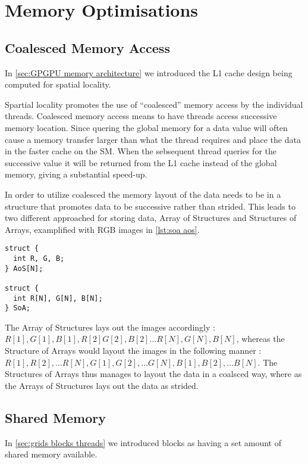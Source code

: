 \section{Memory Optimisations}
\label{sec:memory optimisations}
\subsection{Coalesced Memory Access}
\label{sec:coalesced}

In \cref{sec:GPGPU memory architecture} we introduced the L1 cache design being computed for spatial locality.

Spartial locality promotes the use of ``coalesced'' memory access by the individual threads.
Coalesced memory access means to have threads access successive memory location.
Since quering the global memory for a data value will often cause a memory transfer larger than what the thread requires and place the data in the faster cache on the SM.
When the sebsequent thread queries for the successive value it will be returned from the L1 cache instead of the global memory, giving a substantial speed-up.

In order to utilize coalesced the memory layout of the data needs to be in a structure that promotes data to be successive rather than strided.\cite{udacity}
This leads to two different approached for storing data, Array of Structures and Structures of Arrays, examplified with RGB images in \cref{lst:soa aos}.

\begin{lstlisting}[caption={Example of SoA and AoS with RGB images}, label={lst:soa aos}]
struct {
  int R, G, B;
} AoS[N];

struct {
  int R[N], G[N], B[N];
} SoA;
\end{lstlisting}

The Array of Structures lays out the images accordingly : $R[1], G[1], B[1], R[2] G[2], B[2] ... R[N], G[N], B[N]$, whereas the Structure of Arrays would layout the images in the following manner : $R[1], R[2], ... R[N], G[1], G[2], ... G[N], B[1], B[2], ... B[N]$.
The Structures of Arrays thus manages to layout the data in a coalsced way, where as the Arrays of Structures lays out the data as strided.

\subsection{Shared Memory}
\label{sec:shared memory}
In \cref{sec:grids blocks threads} we introduced blocks as having a set amount of shared memory available.

